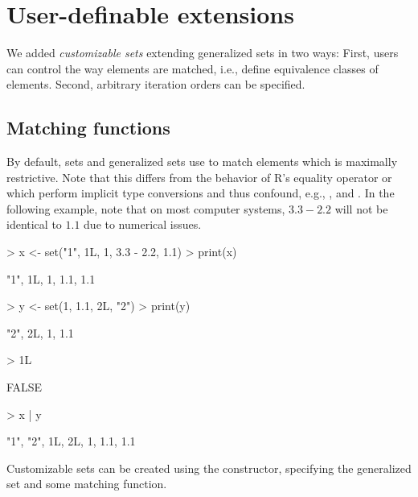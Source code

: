 \documentclass[article]{jss}
\newcommand\R{\textsf{R}}
\newcommand{\codefun}[1]{\code{#1()}}
\begin{document}
\section{User-definable extensions}
\label{sec:csets}

We added \emph{customizable sets}
extending generalized sets in two ways: First, users
can control the way elements are matched, i.e., define equivalence
classes of elements. Second, arbitrary iteration orders can be specified.

\subsection{Matching functions}

By default, sets and generalized sets use
\codefun{identical} to match elements which is maximally
restrictive. Note that this differs from the behavior of
\R's equality operator or
\codefun{match} which perform implicit type conversions
and thus confound, e.g., ,  and . In the
following example, note that on most computer systems, $3.3-2.2$ will not be
identical to $1.1$ due to numerical issues.
\begin{Schunk}
\begin{Sinput}
> x <- set("1", 1L, 1, 3.3 - 2.2, 1.1)
> print(x)
\end{Sinput}
\begin{Soutput}
{"1", 1L, 1, 1.1, 1.1}
\end{Soutput}
\begin{Sinput}
> y <- set(1, 1.1, 2L, "2")
> print(y)
\end{Sinput}
\begin{Soutput}
{"2", 2L, 1, 1.1}
\end{Soutput}
\begin{Sinput}
> 1L %
\end{Sinput}
\begin{Soutput}
[1] FALSE
\end{Soutput}
\begin{Sinput}
> x | y
\end{Sinput}
\begin{Soutput}
{"1", "2", 1L, 2L, 1, 1.1, 1.1}
\end{Soutput}
\end{Schunk}
Customizable sets can be created using the \codefun{cset} constructor,
specifying the generalized set and some matching function.
\end{document}
